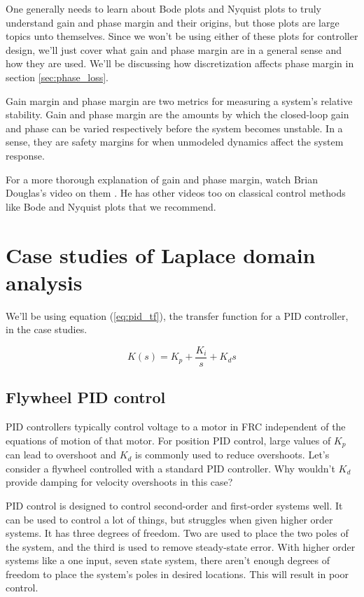 One generally needs to learn about Bode plots and Nyquist plots to truly
understand gain and phase margin and their origins, but those plots are large
topics unto themselves. Since we won't be using either of these plots for
controller design, we'll just cover what gain and phase margin are in a general
sense and how they are used. We'll be discussing how discretization affects
phase margin in section \ref{sec:phase_loss}.

Gain margin and phase margin are two metrics for measuring a system's relative
stability. Gain and phase margin are the amounts by which the closed-loop gain
and phase can be varied respectively before the system becomes unstable. In a
sense, they are safety margins for when unmodeled dynamics affect the system
response.

For a more thorough explanation of gain and phase margin, watch Brian Douglas's
video on them \cite{bib:gain_phase_margin}. He has other videos too on classical
control methods like Bode and Nyquist plots that we recommend.

\section{Case studies of Laplace domain analysis}

We'll be using equation (\ref{eq:pid_tf}), the transfer function for a PID
controller, in the case studies.

\begin{equation}
  K(s) = K_p + \frac{K_i}{s} + K_ds \label{eq:pid_tf}
\end{equation}

\subsection{Flywheel PID control} \label{subsec:flywheel-pid-control}

PID controllers typically control voltage to a motor in FRC independent of the
equations of motion of that motor. For position PID control, large values of
$K_p$ can lead to overshoot and $K_d$ is commonly used to reduce overshoots.
Let's consider a flywheel controlled with a standard PID controller. Why
wouldn't $K_d$ provide damping for velocity overshoots in this case?

PID control is designed to control second-order and first-order systems well. It
can be used to control a lot of things, but struggles when given higher order
systems. It has three degrees of freedom. Two are used to place the two poles of
the system, and the third is used to remove steady-state error. With higher
order systems like a one input, seven state system, there aren't enough degrees
of freedom to place the system's poles in desired locations. This will result in
poor control.

